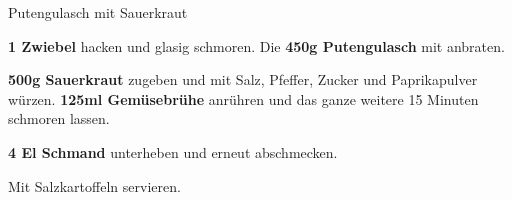 \begin{recipe}[]{Putengulasch mit Sauerkraut} %

\step
\textbf{1 Zwiebel} hacken und glasig schmoren.  Die \textbf{450g Putengulasch} mit anbraten.

\step
\textbf{500g Sauerkraut} zugeben und mit Salz, Pfeffer, Zucker und Paprikapulver würzen. \textbf{125ml Gemüsebrühe} anrühren und das ganze weitere 15 Minuten schmoren lassen.

\step
\textbf{4 El Schmand} unterheben und erneut abschmecken.

\step
Mit Salzkartoffeln servieren.

\end{recipe}
